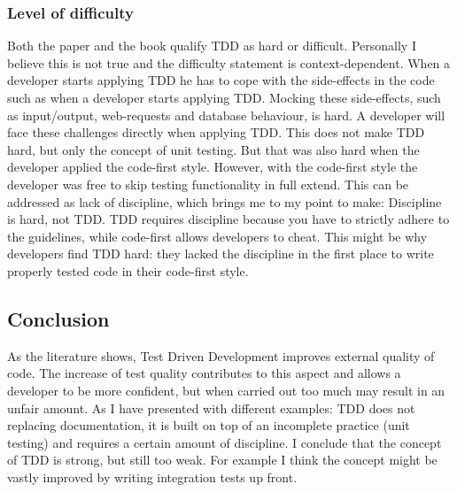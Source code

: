 \subsubsection*{Level of difficulty}

Both the paper and the book qualify TDD as hard or difficult.
Personally I believe this is not true and the difficulty statement is context-dependent.
When a developer starts applying TDD he has to cope with the side-effects in the code such as when a developer starts applying TDD.
Mocking these side-effects, such as input/output, web-requests and database behaviour, is hard.
A developer will face these challenges directly when applying TDD.
This does not make TDD hard, but only the concept of unit testing.
But that was also hard when the developer applied the code-first style.
However, with the code-first style the developer was free to skip testing functionality in full extend.
This can be addressed as lack of discipline, which brings me to my point to make: Discipline is hard, not TDD.
TDD requires discipline because you have to strictly adhere to the guidelines, while code-first allows developers to cheat.
This might be why developers find TDD hard: they lacked the discipline in the first place to write properly tested code in their code-first style.

\subsection*{Conclusion}

As the literature shows, Test Driven Development improves external quality of code.
The increase of test quality contributes to this aspect and allows a developer to be more confident, but when carried out too much may result in an unfair amount.
As I have presented with different examples:
TDD does not replacing documentation, it is built on top of an incomplete practice (unit testing) and requires a certain amount of discipline.
I conclude that the concept of TDD is strong, but still too weak.
For example I think the concept might be vastly improved by writing integration tests up front.
